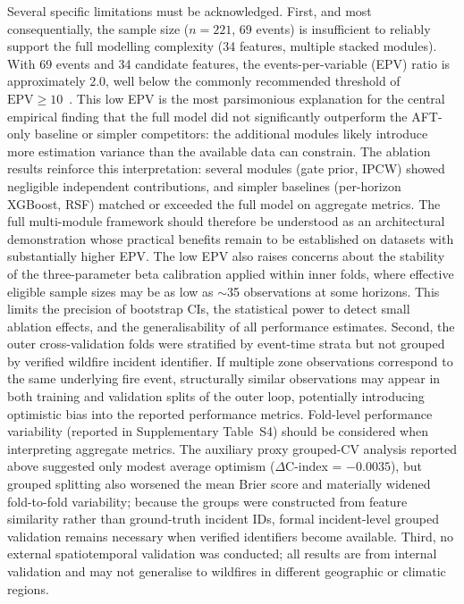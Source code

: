 \documentclass[fire,article,submit,pdftex]{../Definitions/mdpi}
\begin{document}
Several specific limitations must be acknowledged.
First, and most consequentially, the sample size ($n = 221$, 69 events) is insufficient to reliably support the full modelling complexity (34 features, multiple stacked modules).
With 69 events and 34 candidate features, the events-per-variable (EPV) ratio is approximately 2.0, well below the commonly recommended threshold of $\text{EPV} \geq 10$~\cite{Riley2020}.
This low EPV is the most parsimonious explanation for the central empirical finding that the full model did not significantly outperform the AFT-only baseline or simpler competitors: the additional modules likely introduce more estimation variance than the available data can constrain.
The ablation results reinforce this interpretation: several modules (gate prior, IPCW) showed negligible independent contributions, and simpler baselines (per-horizon XGBoost, RSF) matched or exceeded the full model on aggregate metrics.
The full multi-module framework should therefore be understood as an architectural demonstration whose practical benefits remain to be established on datasets with substantially higher EPV.
The low EPV also raises concerns about the stability of the three-parameter beta calibration applied within inner folds, where effective eligible sample sizes may be as low as $\sim$35 observations at some horizons.
This limits the precision of bootstrap CIs, the statistical power to detect small ablation effects, and the generalisability of all performance estimates.
Second, the outer cross-validation folds were stratified by event-time strata but not grouped by verified wildfire incident identifier.
If multiple zone observations correspond to the same underlying fire event, structurally similar observations may appear in both training and validation splits of the outer loop, potentially introducing optimistic bias into the reported performance metrics.
Fold-level performance variability (reported in Supplementary Table~S4) should be considered when interpreting aggregate metrics.
The auxiliary proxy grouped-CV analysis reported above suggested only modest average optimism ($\Delta$C-index = $-0.0035$), but grouped splitting also worsened the mean Brier score and materially widened fold-to-fold variability; because the groups were constructed from feature similarity rather than ground-truth incident IDs, formal incident-level grouped validation remains necessary when verified identifiers become available.
Third, no external spatiotemporal validation was conducted; all results are from internal validation and may not generalise to wildfires in different geographic or climatic regions.
\end{document}
